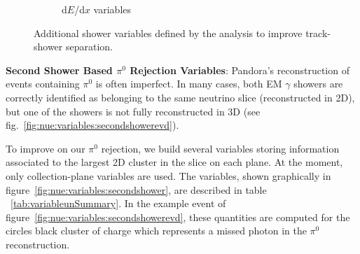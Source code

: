 \begin{figure}[H]
\begin{center}
\begin{subfigure}[b]{0.3\textwidth}
    \caption{\label{fig:nue:variables:dedx} d$E$/d$x$ variables }
    \end{subfigure}
\caption{\label{fig:nue:presel:eff} Additional shower variables defined by the analysis to improve track-shower separation.}
\end{center}
\end{figure}

\par \noindent  \textbf{Second Shower Based $\pi^0$ Rejection Variables}: %
Pandora's reconstruction of events containing $\pi^0$ is often imperfect. In many cases, both EM $\gamma$ showers are correctly identified as belonging to the same neutrino slice (reconstructed in 2D), but one of the showers is not fully reconstructed in 3D (see fig.~\ref{fig:nue:variables:secondshowerevd}).

To improve on our $\pi^0$ rejection, we build several variables storing information associated to the largest 2D cluster in the slice on each plane. At the moment, only collection-plane variables are used. The variables, shown graphically in figure~\ref{fig:nue:variables:secondshower}, are described in table ~\ref{tab:variableunSummary}. In the example event of figure~\ref{fig:nue:variables:secondshowerevd}, these quantities are computed for the circles black cluster of charge which represents a missed photon in the $\pi^0$ reconstruction.

